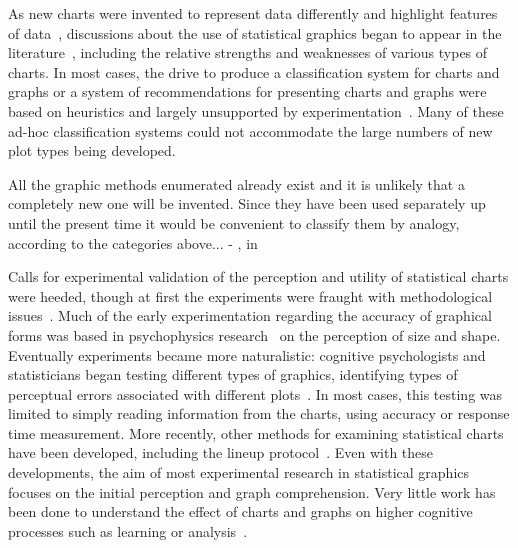 \documentclass[letterpaper]{ar-1col}\usepackage[]{graphicx}\usepackage[]{color}
\newcommand{\todo}[1]{\textcolor{pink}{#1}}
\begin{document}
As new charts were invented to represent data differently and highlight features of data~\citep{bernsteinGraphicPresentationTrend1937,yatesGraphsManagerialTool1985a,mcdonaldFlorenceNightingaleStatistics2014}, discussions about the use of statistical graphics began to appear in the literature~\citep{peuchet1805statistique,brinton1917graphic,karsten1923charts}, including the relative strengths and weaknesses of various types of charts. In most cases, the drive to produce a classification system for charts and graphs or a system of recommendations for presenting charts and graphs were  based on heuristics and largely unsupported by experimentation~\citep{kruskalVisionsMapsGraphs1977,macdonald-rossHowNumbersAre1977}. Many of these ad-hoc classification systems could not accommodate the large numbers of new plot types being developed.

\begin{marginnote}
All the graphic methods enumerated already exist and it is unlikely that
a completely new one will be invented. Since they have been used separately
up until the present time it would be convenient to classify them by analogy,
according to the categories above...
- \citet{EmploiCartographieMethode1858}, in \citet{funkhouserHistoricalDevelopmentGraphical1937}
\end{marginnote}


Calls for experimental validation of the perception and utility of statistical charts were heeded, though at first the experiments were fraught with methodological issues~\citep{croxtonBarChartsCircle1927}. Much of the early experimentation regarding the accuracy of graphical forms was based in psychophysics research~\citep{teghtsoonian_judgment_1965} on the perception of size and shape. Eventually experiments became more naturalistic: cognitive psychologists and statisticians began testing different types of graphics, identifying types of perceptual errors associated with different plots~\citep{spenceVisualPsychophysicsSimple1990,cleveland_graphical_1985}. In most cases, this testing was limited to simply reading information from the charts, using accuracy or response time measurement. More recently, other methods for examining statistical charts have been developed, including the lineup protocol~\citep{wickhamGraphicalInferenceInfovis2010}. Even with these developments, the aim of most experimental research in statistical graphics focuses on the initial perception and graph comprehension. Very little work has been done to understand the effect of charts and graphs on higher cognitive processes such as learning or analysis~\citep{greenPersonalEquationComplex2011}.
\end{document}
